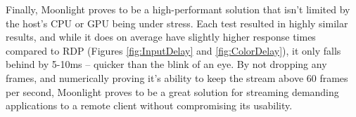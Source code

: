 Finally, Moonlight proves to be a high-performant solution that isn't limited by the host's CPU or GPU being under stress.
Each test resulted in highly similar results, and while it does on average have slightly higher response times compared to RDP (Figures \ref{fig:InputDelay} and \ref{fig:ColorDelay}), it only falls behind by 5-10ms -- quicker than the blink of an eye.
By not dropping any frames, and numerically proving it's ability to keep the stream above 60 frames per second, Moonlight proves to be a great solution for streaming demanding applications to a remote client without compromising its usability.